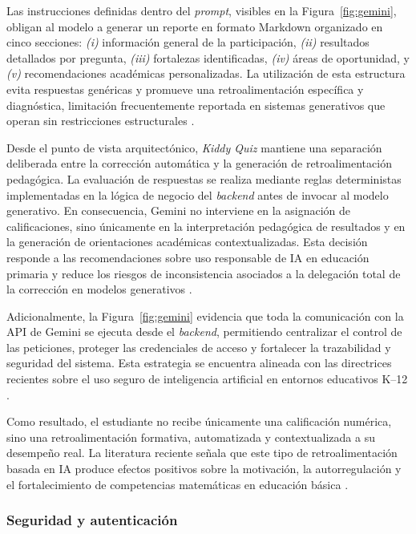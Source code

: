 Las instrucciones definidas dentro del \textit{prompt}, visibles en la Figura~\ref{fig:gemini}, obligan al modelo a generar un reporte en formato Markdown organizado en cinco secciones: \textit{(i)} información general de la participación, \textit{(ii)} resultados detallados por pregunta, \textit{(iii)} fortalezas identificadas, \textit{(iv)} áreas de oportunidad, y \textit{(v)} recomendaciones académicas personalizadas. La utilización de esta estructura evita respuestas genéricas y promueve una retroalimentación específica y diagnóstica, limitación frecuentemente reportada en sistemas generativos que operan sin restricciones estructurales \cite{fokides2025chatgpt}.

Desde el punto de vista arquitectónico, \textit{Kiddy Quiz} mantiene una separación deliberada entre la corrección automática y la generación de retroalimentación pedagógica. La evaluación de respuestas se realiza mediante reglas deterministas implementadas en la lógica de negocio del \textit{backend} antes de invocar al modelo generativo. En consecuencia, Gemini no interviene en la asignación de calificaciones, sino únicamente en la interpretación pedagógica de resultados y en la generación de orientaciones académicas contextualizadas. Esta decisión responde a las recomendaciones sobre uso responsable de IA en educación primaria y reduce los riesgos de inconsistencia asociados a la delegación total de la corrección en modelos generativos \cite{bagdonaite2025ai,fokides2025chatgpt}.

Adicionalmente, la Figura~\ref{fig:gemini} evidencia que toda la comunicación con la API de Gemini se ejecuta desde el \textit{backend}, permitiendo centralizar el control de las peticiones, proteger las credenciales de acceso y fortalecer la trazabilidad y seguridad del sistema. Esta estrategia se encuentra alineada con las directrices recientes sobre el uso seguro de inteligencia artificial en entornos educativos K--12 \cite{topali2025aied}.

Como resultado, el estudiante no recibe únicamente una calificación numérica, sino una retroalimentación formativa, automatizada y contextualizada a su desempeño real. La literatura reciente señala que este tipo de retroalimentación basada en IA produce efectos positivos sobre la motivación, la autorregulación y el fortalecimiento de competencias matemáticas en educación básica \cite{hattie2007feedback,faber2017dfa,rodriguez2023personalised,maksimchuk2025genai}.

\subsubsection{Seguridad y autenticación}
 
